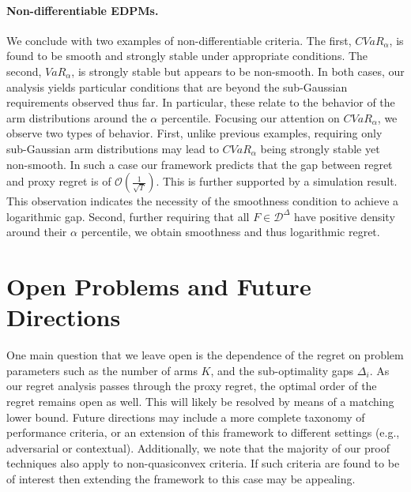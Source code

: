 \documentclass[final,12pt]{colt2018}
\newcommand{\CVAR}[1][\alpha]{CVaR_{#1}}
\newcommand{\VAR}[1][\alpha]{VaR_{#1}}
\newcommand{\EDRMabbrv}{EDPM}
\newcommand{\DistSet}{\mathcal{D}}
\newcommand{\DistSetDelta}{\DistSet^{\Delta}}
\newcommand{\Di}{\Delta_i}
\begin{document}
	\paragraph{Non-differentiable \EDRMabbrv s.}
	We conclude with two examples of non-differentiable criteria. The first, $\CVAR$, is found to be smooth and strongly stable under appropriate conditions. The second, $\VAR$, is strongly stable but appears to be non-smooth. In both cases, our analysis yields particular conditions that are beyond the sub-Gaussian requirements observed thus far. In particular, these relate to the behavior of the arm distributions around the $\alpha$ percentile. 
	Focusing our attention on $\CVAR$, we observe two types of behavior. First, unlike previous examples, requiring only sub-Gaussian arm distributions may lead to $\CVAR$ being strongly stable yet non-smooth. In such a case our framework predicts that the gap between regret and proxy regret is of $\mathcal{O}(\frac{1}{\sqrt{T}})$. This  is further supported by a simulation result. This observation indicates the necessity of the smoothness condition to achieve a logarithmic gap. Second, further requiring that all $F \in \DistSetDelta$ have positive density around their $\alpha$ percentile, we obtain smoothness and thus logarithmic regret.
	
	
	
	

	
	
	
	\section{Open Problems and Future Directions} \label{sec:summary}
	One main question that we leave open is the dependence of the regret on problem parameters such as the number of arms $K$, and the sub-optimality gaps $\Di$. As our regret analysis passes through the proxy regret, the optimal order of the regret remains open as well. This will likely be resolved by means of a matching lower bound. Future directions may include a more complete taxonomy of performance criteria, or an extension of this framework to different settings (e.g., adversarial or contextual). Additionally, we note that the majority of our proof techniques also apply to non-quasiconvex criteria. If such criteria are found to be of interest then extending the framework to this case may be appealing.
	
	
	
	
	
	

	
	
	
	
	

\end{document}
